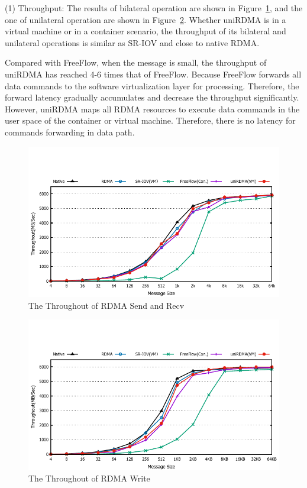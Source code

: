 (1) Throughput: The results of bilateral operation are shown in Figure~\ref{fig:send-bw}, and the one of unilateral operation are shown in Figure~\ref{fig:write-bw}. Whether uniRDMA is in a virtual machine or in a container scenario, the throughput of its bilateral and unilateral operations is similar as SR-IOV and close to native RDMA.

Compared with FreeFlow, when the message is small, the throughput of uniRDMA has reached 4-6 times that of FreeFlow. Because FreeFlow forwards all data commands to the software virtualization layer for processing. Therefore, the forward latency gradually accumulates and decrease the throughput significantly. However, uniRDMA maps all RDMA resources to execute data commands in the user space of the container or virtual machine. Therefore, there is no latency for commands forwarding in data path.

\begin{figure}[!ht]
	\centering
	\includegraphics[width=1.0\linewidth]{images/send-bw.pdf}
	\caption{The Throughout of RDMA Send and Recv}
	\label{fig:send-bw}
\end{figure}

\begin{figure}[!ht]
	\centering
	\includegraphics[width=1.0\linewidth]{images/write-bw.pdf}
	\caption{The Throughout of RDMA Write}
	\label{fig:write-bw}
\end{figure}

